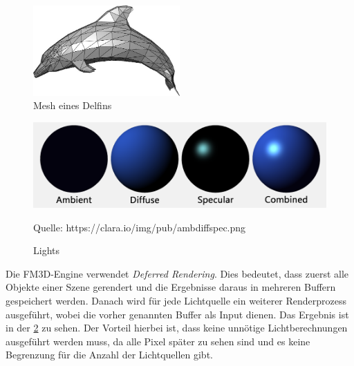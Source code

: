 \begin{figure}
	\begin{center}
		\includegraphics[width=0.5\textwidth]{06anhang/bilder/delphin.jpg}
		\caption{Mesh eines Delfins}
		\label{Dolphin}
	\end{center}
\end{figure}
\begin{figure}
	\centering
	\includegraphics[scale=0.4]{02theorie/amb_diff_spec.png}
		
	Quelle: https://clara.io/img/pub/amb\textunderscore diff\textunderscore spec.png
	\caption{Lights}\label{Img:Lights}
\end{figure}

Die FM3D-Engine verwendet \textit{Deferred Rendering}. Dies bedeutet, dass zuerst alle Objekte einer Szene gerendert und die Ergebnisse daraus in mehreren Buffern gespeichert werden. Danach wird für jede Lichtquelle ein weiterer Renderprozess ausgeführt, wobei die vorher genannten Buffer als Input dienen. Das Ergebnis ist in der \cref{Img:Lights} zu sehen. Der Vorteil hierbei ist, dass keine unnötige Lichtberechnungen ausgeführt werden muss, da alle Pixel später zu sehen sind und es keine Begrenzung für die Anzahl der Lichtquellen gibt. 